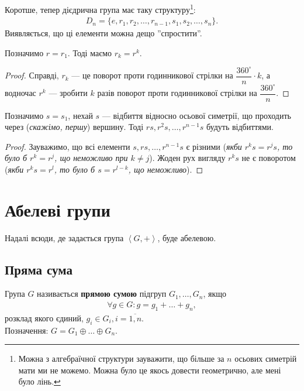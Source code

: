 \documentclass{math_library}
\begin{document}
Коротше, тепер дієдрична група має таку структуру\footnote{Можна з алгебраїчної структури зауважити, що більше за $n$ осьових симетрій мати ми не можемо. Можна було це якось довести геометрично, але мені було лінь.}:
\begin{align*}
D_n = \{e,r_1,r_2,\dots,r_{n-1},s_1,s_2,\dots,s_n\}.
\end{align*}
Виявляється, що ці елементи можна дещо ''спростити''.

\begin{lemma}
Позначимо $r = r_1$. Тоді маємо $r_k = r^k$.
\end{lemma}

\begin{proof}
Справді, $r_k$ --- це поворот проти годинникової стрілки на $\dfrac{360^\circ}{n} \cdot k$, а водночас $r^k$ --- зробити $k$ разів поворот проти годинникової стрілки на $\dfrac{360^\circ}{n}$.
\end{proof}

\begin{lemma}
Позначимо $s = s_1$, нехай $s$ --- відбиття відносно осьової симетрії, що проходить через (\textit{скажімо, першу}) вершину. Тоді $rs,r^2s,\dots,r^{n-1}s$ будуть відбиттями.
\end{lemma}

\begin{proof}
Зауважимо, що всі елементи $s, rs, \dots, r^{n-1}s$ є різними (\textit{якби $r^k s = r^j s$, то було б $r^k = r^j$, що неможливо при $k \neq j$}). Жоден рух вигляду $r^{k} s$ не є поворотом (\textit{якби $r^k s = r^l$, то було б $s = r^{l-k}$, що неможливо}).
\end{proof}

\iffalse
\newpage
\section{Абелеві групи}
Надалі всюди, де задається група $\left<G,+\right>$, буде абелевою.
\subsection{Пряма сума}
\begin{definition}
Група $G$ називається \textbf{прямою сумою} підгруп $G_1,\dots,G_n$, якщо
\begin{align*}
\forall g \in G: g = g_1 + \dots + g_n,
\end{align*}
розклад якого єдиний, $g_i \in G_i, i = \overline{1,n}$.\\
Позначення: $G = G_1 \oplus \dots \oplus G_n$.
\end{definition}
\end{document}
